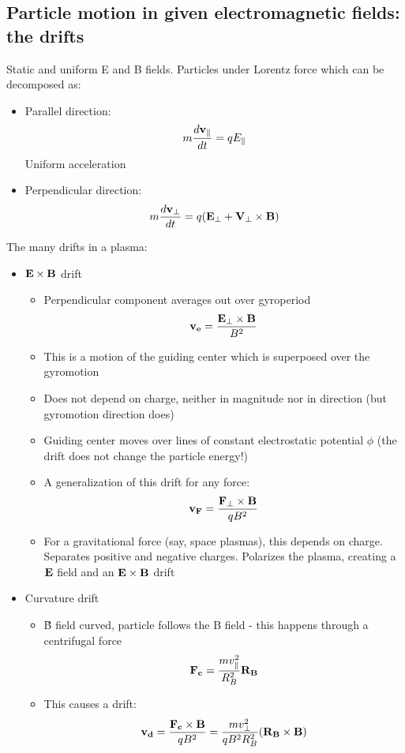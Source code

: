 	\subsection{Particle motion in given electromagnetic fields: the drifts }
Static and uniform E and B fields. Particles under Lorentz force which can be decomposed as:
	\begin{itemize}
		\item Parallel direction: \[m\frac{d \mathbf{v_{\parallel}}}{d t}=qE_{\parallel}\]
	Uniform acceleration
		\item Perpendicular direction: \[m\frac{d \mathbf{v_{\perp}}}{d t}=q(\mathbf{E_{\perp}} + \mathbf{V_{	\perp}}\times\mathbf{B})\]
	\end{itemize}
The many drifts in a plasma:
	\begin{itemize}
		\item $\mathbf{E}\times\mathbf{B}$ drift
		\begin{itemize}
			\item Perpendicular component averages out over gyroperiod
			\[\mathbf{v_e}=\frac{\mathbf{E_{\perp}}\times\mathbf{B}}{B^2}\]
			\item This is a motion of the guiding center which is superposed over the gyromotion
			\item Does not depend on charge, neither in magnitude nor in direction (but gyromotion direction does)
			\item Guiding center moves over lines of constant electrostatic potential $\phi$ (the drift does not change the particle energy!)
			\item A generalization of this drift for any force: \[\mathbf{v_F}=\frac{\mathbf{F_{\perp}}\times\mathbf{B}}{qB^2}\]
			\item For a gravitational force (say, space plasmas), this depends on charge. Separates positive and negative charges. Polarizes the plasma, creating a $\mathbf{E}$ field and an $\mathbf{E}\times\mathbf{B}$ drift
		\end{itemize}
		
		\item Curvature drift
		\begin{itemize}
			\item \v{B} field curved, particle follows the B field - this happens through a centrifugal force
			\[\mathbf{F_c}=\frac{m v_{\parallel}^2}{R_B^2} \mathbf{R_B}\]
			\item This causes a drift:
			\[\mathbf{v_d} = \frac{\mathbf{F_c} \times \mathbf{B}}{q B^2} = \frac{m v_{\perp}^2}{q B^2 R_B^2} (\mathbf{R_B} \times \mathbf{B})\]
		\end{itemize}
		

\end{itemize}
